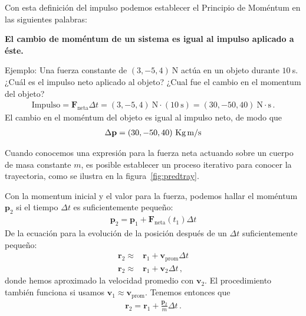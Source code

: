 Con esta definición del impulso podemos establecer el Principio de Moméntum en las siguientes palabras:
\begin{frame}
  \begin{center}
    \textbf{El cambio de moméntum de un sistema es igual al impulso aplicado a éste.}
  \end{center}
\end{frame}

Ejemplo: Una fuerza constante de $(3,-5,4)\ $N actúa en un objeto durante $10\ $s. ¿Cuál es el impulso neto aplicado al objeto? ¿Cual fue el cambio en el momentum del objeto?
\begin{align}
\text{Impulso}=\mathbf{F}_{\text{neta}}\Delta t=(3,-5,4)\ \text{N}\cdot (10\ \text{s})=
(30,-50,40)\ \text{N}\cdot\text{s}\,.
\end{align}
El cambio en el moméntum del objeto es igual al impulso neto, de modo que
\begin{align}
  \Delta \mathbf{p}=(30,-50,40)\ \text{Kg\,m/s}
\end{align}

Cuando conocemos una expresión para la fuerza neta actuando sobre un cuerpo de masa constante $m$, es posible establecer un proceso iterativo para conocer la trayectoria, como se ilustra en la figura~\ref{fig:predtray}.

Con la momentum inicial y el valor para la fuerza, podemos hallar el moméntum $\mathbf{p}_2$ si el tiempo $\Delta t$ es suficientemente pequeño:
\begin{align*}
  \mathbf{p}_2=\mathbf{p}_1+\mathbf{F}_{\text{neta}}(t_1)\Delta t
\end{align*}
De la ecuación para la evolución de la posición después de un $\Delta t$ suficientemente pequeño:
\begin{align*}
  \mathbf{r}_2\approx&\mathbf{r}_1+\mathbf{v}_{\text{prom}}\Delta t\nonumber\\
  \mathbf{r}_2\approx&\mathbf{r}_1+\mathbf{v}_2\Delta t\,,
\end{align*}
donde hemos aproximado la velocidad promedio con $\mathbf{v}_2$. El procedimiento también funciona si usamos $\mathbf{v}_1\approx\mathbf{v}_{\text{prom}}$. Tenemos entonces que
\begin{align*}
    \mathbf{r}_2=\mathbf{r}_1+\frac{\mathbf{p}_2}{m}\Delta t\,.
\end{align*}


